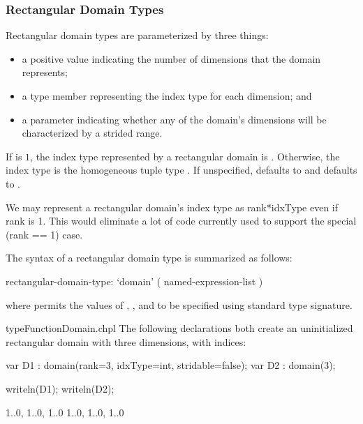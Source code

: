 \subsubsection{Rectangular Domain Types}

Rectangular domain types are parameterized by three things:
\begin{itemize}
\item {} a positive  value indicating the number
of dimensions that the domain represents;
\item {} a type member representing the index type for
each dimension; and
\item {} a  parameter indicating whether
any of the domain's dimensions will be characterized by a strided
range.
\end{itemize}
If  is $1$, the index type represented by a rectangular
domain is .  Otherwise, the index type is the homogeneous
tuple type .
If unspecified,  defaults
to  and  defaults to .

\begin{openissue}
We may represent a rectangular domain's index type as rank*idxType even if rank is 1.  This
would eliminate a lot of code currently used to support the special (rank == 1) case.
\end{openissue}

The syntax of a rectangular domain type is summarized as follows:
\begin{syntax}
rectangular-domain-type:
  `domain' ( named-expression-list )
\end{syntax}

\noindent where  permits the values of
, , and  to be specified
using standard type signature.

\begin{chapelexample}{typeFunctionDomain.chpl}
The following declarations both create an uninitialized rectangular domain with three dimensions, with  indices:
\begin{chapel}
var D1 : domain(rank=3, idxType=int, stridable=false);
var D2 : domain(3);
\end{chapel}
\begin{chapelpost}
writeln(D1);
writeln(D2);
\end{chapelpost}
\begin{chapeloutput}
{1..0, 1..0, 1..0}
{1..0, 1..0, 1..0}
\end{chapeloutput}
\end{chapelexample}

